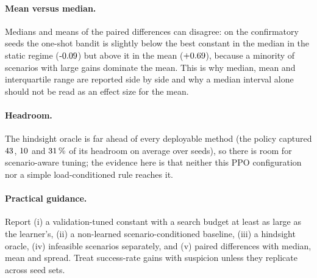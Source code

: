 \paragraph*{Mean versus median.} Medians and means of the paired differences can disagree: on the confirmatory seeds the one-shot bandit is slightly below the best constant in the median in the static regime ($\ConfThreeStaticBanditMed$) but above it in the mean ($+0.69$), because a minority of scenarios with large gains dominate the mean. This is why median, mean and interquartile range are reported side by side and why a median interval alone should not be read as an effect size for the mean.

\paragraph*{Headroom.} The hindsight oracle is far ahead of every deployable method (the policy captured $43$, $10$ and $31\,\%$ of its headroom on average over seeds), so there is room for scenario-aware tuning; the evidence here is that neither this PPO configuration nor a simple load-conditioned rule reaches it.

\paragraph*{Practical guidance.} Report (i) a validation-tuned constant with a search budget at least as large as the learner's, (ii) a non-learned scenario-conditioned baseline, (iii) a hindsight oracle, (iv) infeasible scenarios separately, and (v) paired differences with median, mean and spread. Treat success-rate gains with suspicion unless they replicate across seed sets.
